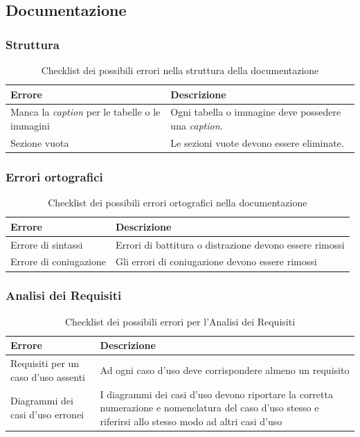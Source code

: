\documentclass[a4paper,10pt]{article}
\begin{document}
\subsection{Documentazione}
\subsubsection{Struttura}
\begin{table}[H]
\centering
\renewcommand{\arraystretch}{1.2}
\begin{tabular}{|p{4cm}|p{9cm}|}
\hline
\textbf{Errore} & \textbf{Descrizione} \\
\hline
Manca la \textit{caption} per le tabelle o le immagini &
Ogni tabella o immagine deve possedere una \textit{caption}. \\
\hline
Sezione vuota &
Le sezioni vuote devono essere eliminate. \\
\hline
\end{tabular}
\caption{Checklist dei possibili errori nella struttura della documentazione}
\label{tab:checklist-struttura}
\end{table}
\subsubsection{Errori ortografici}
\begin{table}[H]
\centering
\renewcommand{\arraystretch}{1.2}
\begin{tabular}{|p{4cm}|p{9cm}|}
\hline
\textbf{Errore} & \textbf{Descrizione} \\
\hline
Errore di sintassi & Errori di battitura o distrazione devono essere rimossi \\
\hline
Errore di coniugazione & Gli errori di coniugazione devono essere rimossi \\
\hline
\end{tabular}
\caption{Checklist dei possibili errori ortografici nella documentazione}
\label{tab:checklist-ortografia}
\end{table}

\subsubsection{Analisi dei Requisiti}
\begin{table}[H]
\centering
\renewcommand{\arraystretch}{1.2}
\begin{tabular}{|p{4cm}|p{9cm}|}
\hline
\textbf{Errore} & \textbf{Descrizione} \\
\hline
Requisiti per un caso d'uso assenti & Ad ogni caso d'uso deve corrispondere almeno un requisito \\
\hline
Diagrammi dei casi d'uso erronei & I diagrammi dei casi d'uso devono riportare la corretta numerazione e nomenclatura del caso d'uso stesso e riferirsi allo stesso modo ad altri casi d'uso \\
\hline
\end{tabular}
\caption{Checklist dei possibili errori per l'Analisi dei Requisiti}
\label{tab:checklist-analisi}
\end{table}
\end{document}
